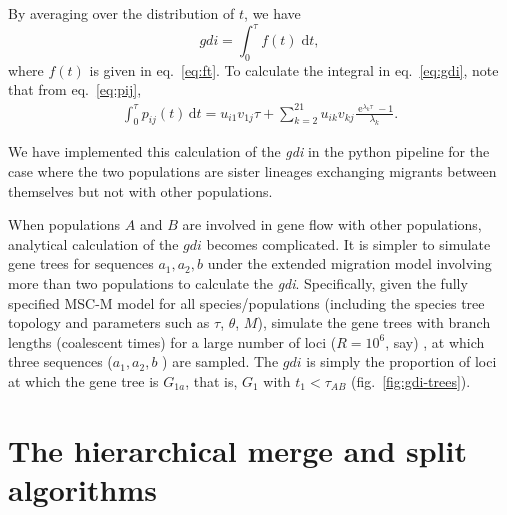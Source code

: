\documentclass[A4]{article1}
\renewcommand{\d}{\mathrm{d}}
\DeclareMathOperator{\e}{\mathrm{e}}
\begin{document}
By averaging over the distribution of $t$, we have 
\begin{equation} \label{eq:gdi} 
    gdi = \int_0^\tau f(t) \; \d t ,
\end{equation}
where $f(t)$ is given in eq.~\ref{eq:ft}. To calculate the integral in eq.~\ref{eq:gdi},
note that from eq.~\ref{eq:pij},
\begin{equation} 
   \begin{aligned}
      \int_0^\tau p_{ij}(t) \,\d t = 
       u_{i1} v_{1j}\tau %
       + \sum_{k=2}^{21} u_{ik} v_{kj} \frac{\e^{\lambda_k \tau} - 1}{\lambda_k} .
   \end{aligned}
\end{equation}

We have implemented this calculation of the \textit{gdi} in the python pipeline for the
case where the two populations are sister lineages exchanging migrants between
themselves but not with other populations.

When populations $A$ and $B$ are involved in gene flow with other populations,
analytical calculation of the $gdi$ becomes complicated.  It is simpler to simulate gene
trees for sequences $a_1, a_2, b$ under the extended migration model involving more than
two populations to calculate the \textit{gdi}.  Specifically, given the fully specified
MSC-M model for all species/populations (including the species tree topology and
parameters such as $\tau$, $\theta$, $M$), simulate the gene trees with branch lengths
(coalescent times) for a large number of loci ($R = 10^6$, say) , at which three
sequences ($a_1, a_2, b$ ) are sampled.  The $gdi$ is simply the proportion of loci at
which the gene tree is $G_{1a}$, that is, $G_1$ with $t_1 < \tau_{AB}$
(fig.~\ref{fig:gdi-trees}).



\section{The hierarchical merge and split algorithms}
\end{document}
